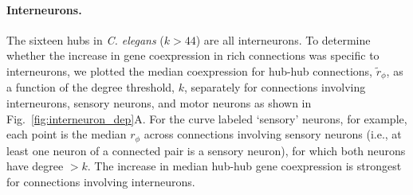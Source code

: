 \documentclass[10pt,letterpaper]{article}
\begin{document}
\paragraph{Interneurons.}
The sixteen hubs in \textit{C. elegans} ($k > 44$) are all interneurons.
To determine whether the increase in gene coexpression in rich connections was specific to interneurons, we plotted the median coexpression for hub-hub connections, $\tilde{r}_\phi$, as a function of the degree threshold, $k$, separately for connections involving interneurons, sensory neurons, and motor neurons as shown in Fig.~\ref{fig:interneuron_dep}A.
For the curve labeled `sensory' neurons, for example, each point is the median $r_\phi$ across connections involving sensory neurons (i.e., at least one neuron of a connected pair is a sensory neuron), for which both neurons have degree $>k$.
The increase in median hub-hub gene coexpression is strongest for connections involving interneurons.
\end{document}
